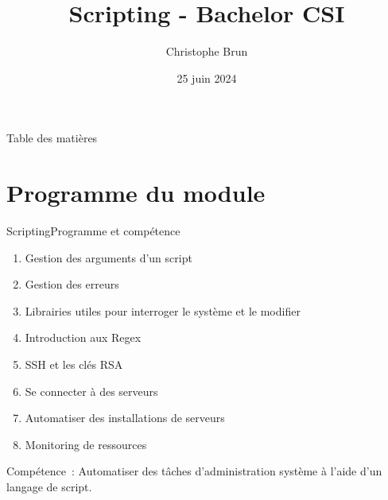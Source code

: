\documentclass{beamer}
\title{Scripting - Bachelor CSI}
\author{Christophe Brun}
\institute{Campus Saint-Michel IT}
\date{25 juin 2024}
\begin{document}
    \begin{frame}
        \titlepage
        \bigbreak
    \end{frame}

    \begin{frame}{Table des matières}
        \tableofcontents
    \end{frame}


    \section{Programme du module}\label{sec:programme-du-module}
    \begin{frame}{Scripting}{Programme et compétence}
        \begin{enumerate}
            \item Gestion des arguments d’un script
            \item Gestion des erreurs
            \item Librairies utiles pour interroger le système et le modifier
            \item Introduction aux Regex
            \item SSH et les clés RSA
            \item Se connecter à des serveurs
            \item Automatiser des installations de serveurs
            \item Monitoring de ressources
        \end{enumerate}
        Compétence~:
        \bigbreak
        Automatiser des tâches d’administration système à l’aide d’un langage de script.
    \end{frame}
\end{document}
